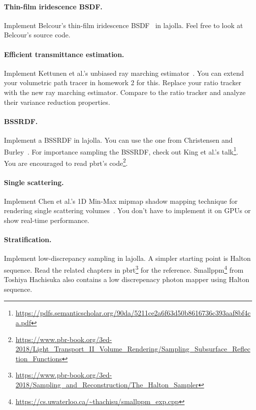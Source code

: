 \paragraph{Thin-film iridescence BSDF.}
Implement Belcour's thin-film iridescence BSDF~\cite{Belcour:2017:PEM} in lajolla.
Feel free to look at Belcour's source code.

\paragraph{Efficient transmittance estimation.}
Implement Kettunen et al.'s unbiased ray marching estimator~\cite{Kettunen:2021:URT}.
You can extend your volumetric path tracer in homework 2 for this.
Replace your ratio tracker with the new ray marching estimator.
Compare to the ratio tracker and analyze their variance reduction properties.

\paragraph{BSSRDF.}
Implement a BSSRDF in lajolla.
You can use the one from Christensen and Burley~\cite{Christensen:2015:ARP}.
For importance sampling the BSSRDF, check out King et al.'s talk\footnote{\url{https://pdfs.semanticscholar.org/90da/5211ce2a6f63d50b8616736c393aaf8bf4ca.pdf}}.
You are encouraged to read pbrt's code\footnote{\url{https://www.pbr-book.org/3ed-2018/Light_Transport_II_Volume_Rendering/Sampling_Subsurface_Reflection_Functions}}.

\paragraph{Single scattering.}
Implement Chen et al.'s 1D Min-Max mipmap shadow mapping technique for rendering single scattering volumes~\cite{Chen:2011:RVS}.
You don't have to implement it on GPUs or show real-time performance.

\paragraph{Stratification.}
Implement low-discrepancy sampling in lajolla.
A simpler starting point is Halton sequence.
Read the related chapters in pbrt\footnote{\url{https://www.pbr-book.org/3ed-2018/Sampling_and_Reconstruction/The_Halton_Sampler}} for the reference.
Smallppm\footnote{\url{https://cs.uwaterloo.ca/~thachisu/smallppm_exp.cpp}} from Toshiya Hachisuka also contains a low discrepenacy photon mapper using Halton sequence.


